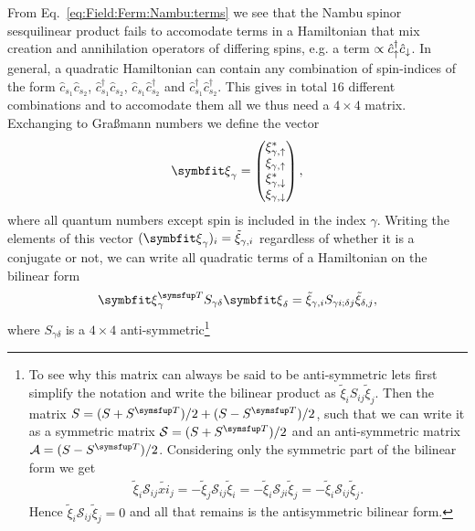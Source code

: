 From Eq.~\eqref{eq:Field:Ferm:Nambu:terms} we see that the Nambu spinor sesquilinear product fails to accomodate terms in a Hamiltonian that mix creation and annihilation
operators of differing spins, e.g. a term $\propto \hat{c}_\uparrow^\dagger\hat{c}_\downarrow$. 
In general, a quadratic Hamiltonian can contain any combination of spin-indices of the form $\hat{c}_{s_1}\hat{c}_{s_2}$, $\hat{c}_{s_1}^\dagger\hat{c}_{s_2}$,
$\hat{c}_{s_1}\hat{c}_{s_2}^\dagger$ and
$\hat{c}_{s_1}^\dagger\hat{c}_{s_2}^\dagger$. This gives in total $16$ different combinations and to accomodate them all we thus need a $4\times4$ matrix.
Exchanging to Gra\ss mann numbers we define the vector
\begin{equation}
    \label{eq:Field:Ferm:ExNambu:spinor}
    \v{\xi}_\gamma = 
    \begin{pmatrix}
        \xi_{\gamma,\up}^\ast\\
        \xi_{\gamma,\up}\\
        \xi_{\gamma,\dn}^\ast\\
        \xi_{\gamma,\dn}
    \end{pmatrix},
\end{equation}
where all quantum numbers except spin is included in the index $\gamma$.
Writing the elements of this vector $(\v{\xi}_\gamma)_i = \tilde{\xi}_{\gamma,i}$ regardless of whether it is a conjugate or not, 
we can write all quadratic terms of a Hamiltonian on the bilinear form
\begin{equation}
    \label{eq:Field:Ferm:ExNambu:bilinear}
    \v{\xi}_\gamma^\trans S_{\gamma\delta}\v{\xi}_\delta = \tilde{\xi}_{\gamma,i}S_{\gamma i; \delta j}\tilde{\xi}_{\delta, j},
\end{equation}
where $S_{\gamma\delta}$ is a $4\times4$ anti-symmetric\footnote{To see why this matrix can always be said to be anti-symmetric lets first simplify the notation
and write the bilinear product as $\tilde{\xi}_iS_{ij}\tilde{\xi}_j$. Then the matrix $S = (S + S^\trans)/2 + (S - S^\trans)/2$, such that we can write it as a
symmetric matrix ${\mathcal{S} = (S+S^\trans)/2}$ and an anti-symmetric matrix $\mathcal{A} = (S-S^\trans)/2$. Considering only the symmetric part of the bilinear
form we get
\begin{equation*}
    \begin{split}
        \tilde{\xi}_i\mathcal{S}_{ij}\tilde{xi}_j = -\tilde{\xi}_j\mathcal{S}_{ij}\tilde{\xi}_i = -\tilde{\xi}_i\mathcal{S}_{ji}\tilde{\xi}_j = -\tilde{\xi}_i\mathcal{S}_{ij}\tilde{\xi}_j.
    \end{split}
\end{equation*}
Hence $\tilde{\xi}_i\mathcal{S}_{ij}\tilde{\xi}_j = 0$ and all that remains is the antisymmetric bilinear form.}
